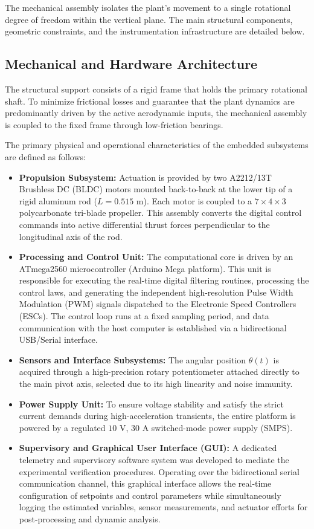 \documentclass[pdflatex,sn-mathphys-num,iicol]{sn-jnl}
\theoremstyle{thmstyleone}%
\theoremstyle{thmstyletwo}%
\theoremstyle{thmstylethree}%
\begin{document}
The mechanical assembly isolates the plant's movement to a single rotational degree of freedom within the vertical plane. The main structural components, geometric constraints, and the instrumentation infrastructure are detailed below.

\subsection{Mechanical and Hardware Architecture}
\label{sub:hardware}

The structural support consists of a rigid frame that holds the primary rotational shaft. To minimize frictional losses and guarantee that the plant dynamics are predominantly driven by the active aerodynamic inputs, the mechanical assembly is coupled to the fixed frame through low-friction bearings. 

The primary physical and operational characteristics of the embedded subsystems are defined as follows:
\begin{itemize}
    \item \textbf{Propulsion Subsystem:} Actuation is provided by two A2212/13T Brushless DC (BLDC) motors mounted back-to-back at the lower tip of a rigid aluminum rod ($L = 0.515\text{ m}$). Each motor is coupled to a $7\times4\times3$ polycarbonate tri-blade propeller. This assembly converts the digital control commands into active differential thrust forces perpendicular to the longitudinal axis of the rod.
    \item \textbf{Processing and Control Unit:} The computational core is driven by an ATmega2560 microcontroller (Arduino Mega platform). This unit is responsible for executing the real-time digital filtering routines, processing the control laws, and generating the independent high-resolution Pulse Width Modulation (PWM) signals dispatched to the Electronic Speed Controllers (ESCs). The control loop runs at a fixed sampling period, and data communication with the host computer is established via a bidirectional USB/Serial interface.
    \item \textbf{Sensors and Interface Subsystems:} The angular position $\theta(t)$ is acquired through a high-precision rotary potentiometer attached directly to the main pivot axis, selected due to its high linearity and noise immunity. 
    \item \textbf{Power Supply Unit:} To ensure voltage stability and satisfy the strict current demands during high-acceleration transients, the entire platform is powered by a regulated $10\text{ V}$, $30\text{ A}$ switched-mode power supply (SMPS).
    \item \textbf{Supervisory and Graphical User Interface (GUI):} A dedicated telemetry and supervisory software system was developed to mediate the experimental verification procedures. Operating over the bidirectional serial communication channel, this graphical interface allows the real-time configuration of setpoints and control parameters while simultaneously logging the estimated variables, sensor measurements, and actuator efforts for post-processing and dynamic analysis.
\end{itemize}
\end{document}
